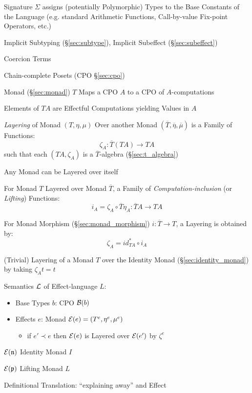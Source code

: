 Signature $\Sigma$ assigns (potentially Polymorphic) Types to the Base
Constants of the Language (e.g. standard Arithmetic Functions,
Call-by-value Fix-point Operators, etc.)

Implicit Subtyping (\S\ref{sec:subtype}), Implicit Subeffect
(\S\ref{sec:subeffect})

Coercion Terms

Chain-complete Posets (CPO \S\ref{sec:cpo})

Monad (\S\ref{sec:monad}) $T$ Maps a CPO $A$ to a CPO of
$A$-computations

Elements of $T A$ are Effectful Computations yielding Values in $A$

\emph{Layering} of Monad $(T,\eta,\mu)$ Over another Monad
$(\overline{T}, \overline{\eta}, \overline{\mu})$ is a Family of
Functions:
\[
  \zeta_A : \overline{T}(T A) \rightarrow T A
\]
such that each $(T A, \zeta_A)$ is a $\overline{T}$-algebra
(\S\ref{sec:t_algebra}) %

Any Monad can be Layered over itself %

For Monad $T$ Layered over Monad $\overline{T}$, a Family of
\emph{Computation-inclusion} (or \emph{Lifting}) Functions:
\[
  i_A = \zeta_A \circ \overline{T} \eta_A :
    \overline{T} A \rightarrow T A
\]

For Monad Morphism (\S\ref{sec:monad_morphism}) $i : \overline{T}
\rightarrow T$, a Layering is obtained by:
\[
  \zeta_A = id^*_{T A} \circ i_A
\]

(Trivial) Layering of a Monad $T$ over the Identity Monad
(\S\ref{sec:identity_monad}) by taking $\zeta_A t = t$

Semantics $\mathcal{L}$ of Effect-language $L$:
\begin{itemize}
  \item Base Types $b$: CPO $\mathcal{B}(b)$
  \item Effects $e$: Monad $\mathcal{E}(e) = (T^e,\eta^e,\mu^e)$
    \begin{itemize}
      \item if $e' \prec e$ then $\mathcal{E}(e)$ is Layered over
        $\mathcal{E}(e')$ by $\zeta^e$
    \end{itemize}
\end{itemize}

$\mathcal{E}(\mathfrak{n})$ Identity Monad $I$

$\mathcal{E}(\mathfrak{p})$ Lifting Monad $L$

Definitional Translation: ``explaining away'' and Effect

